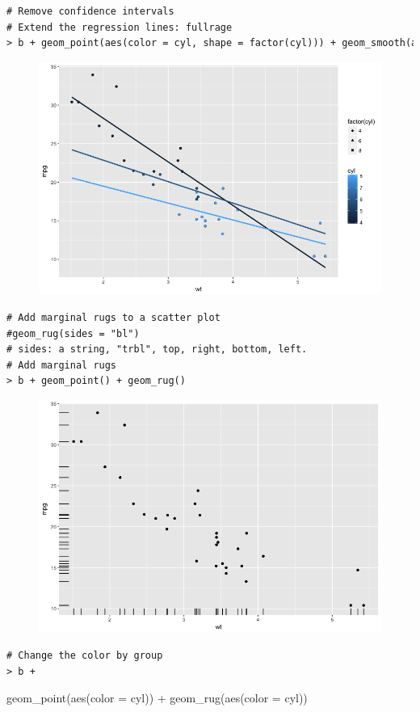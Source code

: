 \begin{lstlisting}[language=html]
# Remove confidence intervals
# Extend the regression lines: fullrage
> b + geom_point(aes(color = cyl, shape = factor(cyl))) + geom_smooth(aes(color = cyl), method = lm, se = FALSE, fullrange = TRUE)
\end{lstlisting}
\begin{figure}[H]\begin{center}\includegraphics[scale=1 ]{ilu/bg49.png}\end{center}\end{figure}
\begin{lstlisting}[language=html]
# Add marginal rugs to a scatter plot
#geom_rug(sides = "bl")
# sides: a string, "trbl", top, right, bottom, left.
# Add marginal rugs
> b + geom_point() + geom_rug()
\end{lstlisting}
\begin{figure}[H]\begin{center}\includegraphics[scale=1 ]{ilu/bg50.png}\end{center}\end{figure}
\begin{lstlisting}[language=html]
# Change the color by group
> b +\end{lstlisting} geom_point(aes(color = cyl)) + geom_rug(aes(color = cyl))

